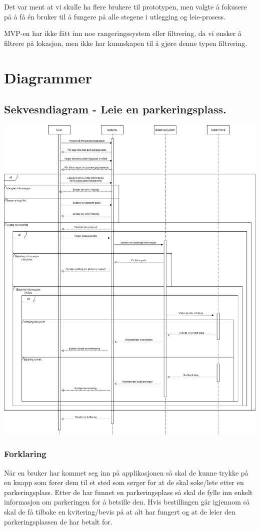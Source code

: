 \documentclass[12pt]{article}
\begin{document}
    Det var ment at vi skulle ha flere brukere til prototypen, men valgte å fokusere på å få én bruker til å fungere på alle stegene i utlegging og leie-prosess.
    
    MVP-en har ikke fått inn noe rangeringssystem eller filtrering, da vi ønsker å filtrere på lokasjon, men ikke har kunnskapen til å gjøre denne typen filtrering.

\section{Diagrammer}
    \subsection{Sekvesndiagram - Leie en parkeringsplass.}
    \includegraphics[max width=\textwidth]{bilder/diagrammer/sekvens_leietaker.png}
            \subsubsection{Forklaring}
            Når en bruker har kommet seg inn på applikasjonen så skal de kunne trykke på en knapp som fører dem til et sted som sørger for at de skal søke/lete etter en parkeringsplass. Etter de har funnet en parkeringsplass så skal de fylle inn enkelt informasjon om parkeringen for å betsille den. Hvis bestillingen går igjennom så skal de få tilbake en kvitering/bevis på at alt har fungert og at de leier den parkeringsplassen de har betalt for.
\end{document}
